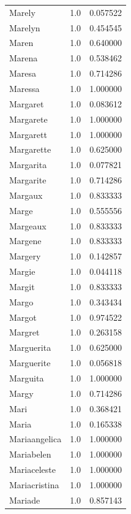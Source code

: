 \documentclass[
  letterpaper,
  DIV=11,
  numbers=noendperiod]{scrreprt}
\begin{document}
\begin{tabular}{lrr}
Marely          &   1.0 &   0.057522 \\
Marelyn         &   1.0 &   0.454545 \\
Maren           &   1.0 &   0.640000 \\
Marena          &   1.0 &   0.538462 \\
Maresa          &   1.0 &   0.714286 \\
Maressa         &   1.0 &   1.000000 \\
Margaret        &   1.0 &   0.083612 \\
Margarete       &   1.0 &   1.000000 \\
Margarett       &   1.0 &   1.000000 \\
Margarette      &   1.0 &   0.625000 \\
Margarita       &   1.0 &   0.077821 \\
Margarite       &   1.0 &   0.714286 \\
Margaux         &   1.0 &   0.833333 \\
Marge           &   1.0 &   0.555556 \\
Margeaux        &   1.0 &   0.833333 \\
Margene         &   1.0 &   0.833333 \\
Margery         &   1.0 &   0.142857 \\
Margie          &   1.0 &   0.044118 \\
Margit          &   1.0 &   0.833333 \\
Margo           &   1.0 &   0.343434 \\
Margot          &   1.0 &   0.974522 \\
Margret         &   1.0 &   0.263158 \\
Marguerita      &   1.0 &   0.625000 \\
Marguerite      &   1.0 &   0.056818 \\
Marguita        &   1.0 &   1.000000 \\
Margy           &   1.0 &   0.714286 \\
Mari            &   1.0 &   0.368421 \\
Maria           &   1.0 &   0.165338 \\
Mariaangelica   &   1.0 &   1.000000 \\
Mariabelen      &   1.0 &   1.000000 \\
Mariaceleste    &   1.0 &   1.000000 \\
Mariacristina   &   1.0 &   1.000000 \\
Mariade         &   1.0 &   0.857143 \\

\end{tabular}
\end{document}
